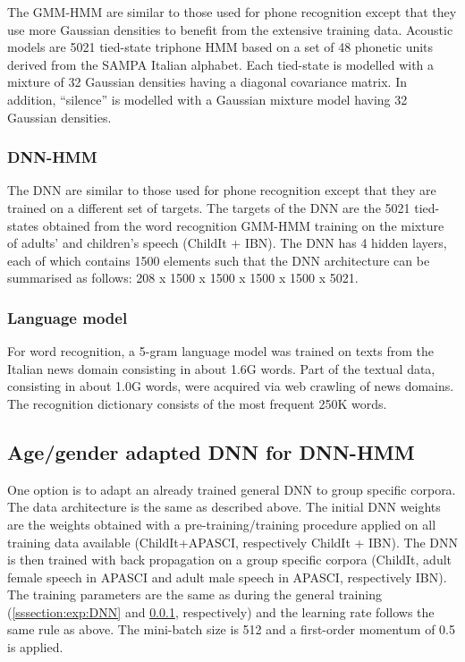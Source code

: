 \documentclass{nle}
\begin{document}
The GMM-HMM are similar to those used for phone recognition except that they use more Gaussian densities to benefit from the extensive training data. Acoustic models  are 5021 tied-state  triphone HMM
based on  a set of  48 phonetic units  derived from the  SAMPA Italian
alphabet. Each tied-state is modelled with  a mixture of  32 Gaussian
densities   having  a  diagonal   covariance  matrix. In  addition,
``silence''  is  modelled  with  a  Gaussian mixture  model  having  32
Gaussian densities.


\subsubsection{DNN-HMM}\label{sssection:exp:DNNW}
The DNN  are similar to those  used for phone  recognition except that
they are  trained on a different  set of targets. The  targets of the
DNN are the 5021 tied-states obtained from the word recognition GMM-HMM training on the
mixture of adults' and children's  speech (ChildIt + IBN). The DNN has
4 hidden  layers, each of which  contains 1500 elements  such that the
DNN architecture  can be summarised  as follows: 208  x 1500 x  1500 x
1500 x 1500 x 5021.

\subsubsection{Language model}
For word  recognition, a  5-gram language model  was trained  on texts
from the Italian  news domain consisting in about  1.6G words. Part of
the textual  data, consisting in  about 1.0G words, were  acquired via
web crawling of news  domains.  The recognition dictionary consists of
the most frequent 250K words.

\subsection{Age/gender adapted DNN for DNN-HMM}
One option is to adapt an already trained general DNN  to group specific corpora. The data architecture is the same as described above. The initial DNN weights are the weights obtained with a pre-training/training procedure applied on all training data available  (ChildIt+APASCI, respectively ChildIt + IBN). The DNN is then trained with back propagation on a group specific corpora (ChildIt, adult female speech in APASCI and adult male speech in APASCI, respectively IBN). The training parameters are the same as during the general training (\ref{sssection:exp:DNN} and \ref{sssection:exp:DNNW}, respectively) and the learning rate follows the same rule as above. The mini-batch size is 512 and a first-order momentum of 0.5 is applied.
\end{document}
